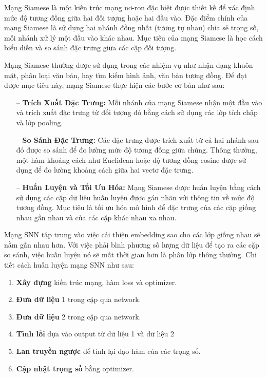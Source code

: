 \documentclass[a4paper, 12pt, openany]{book}
\begin{document}
Mạng Siamese là một kiến trúc mạng nơ-ron đặc biệt được thiết kế để xác định mức độ tương đồng giữa hai đối tượng hoặc hai đầu vào. Đặc điểm chính của mạng Siamese là sử dụng hai nhánh đồng nhất (tương tự nhau) chia sẻ trọng số, mỗi nhánh xử lý một đầu vào khác nhau. Mục tiêu của mạng Siamese là học cách biểu diễn và so sánh đặc trưng giữa các cặp đối tượng.

Mạng Siamese thường được sử dụng trong các nhiệm vụ như nhận dạng khuôn mặt, phân loại văn bản, hay tìm kiếm hình ảnh, văn bản tương đồng. Để đạt được mục tiêu này, mạng Siamese thực hiện các bước cơ bản như sau:

\begin{itemize}
    \item[--] \textbf{Trích Xuất Đặc Trưng:} Mỗi nhánh của mạng Siamese nhận một đầu vào và trích xuất đặc trưng từ đối tượng đó bằng cách sử dụng các lớp tích chập và lớp pooling.

    \item[--] \textbf{So Sánh Đặc Trưng:} Các đặc trưng được trích xuất từ cả hai nhánh sau đó được so sánh để đo lường mức độ tương đồng giữa chúng. Thông thường, một hàm khoảng cách như Euclidean hoặc độ tương đồng cosine được sử dụng để đo lường khoảng cách giữa hai vectơ đặc trưng.

    \item[--] \textbf{Huấn Luyện và Tối Ưu Hóa:} Mạng Siamese được huấn luyện bằng cách sử dụng các cặp dữ liệu huấn luyện được gán nhãn với thông tin về mức độ tương đồng. Mục tiêu là tối ưu hóa mô hình để đặc trưng của các cặp giống nhau gần nhau và của các cặp khác nhau xa nhau.
\end{itemize}

Mạng SNN tập trung vào việc cải thiện embedding sao cho các lớp giống nhau sẽ nằm gần nhau hơn. Với việc phải bình phương số lượng dữ liệu để tạo ra các cặp so sánh, việc huấn luyện nó sẽ mất thời gian hơn là phân lớp thông thường.
Chi tiết cách huấn luyện mạng SNN như sau:

\begin{enumerate}
    \item \textbf{Xây dựng} kiến trúc mạng, hàm loss và optimizer.
    \item \textbf{Đưa dữ liệu} 1 trong cặp qua network.
    \item \textbf{Đưa dữ liệu} 2 trong cặp qua network.
    \item \textbf{Tình lỗi} dựa vào output từ dữ liệu 1 và dữ liệu 2
    \item \textbf{Lan truyền ngược} để tính lại đạo hàm của các trọng số.
    \item \textbf{Cập nhật trọng số} bằng optimizer.
\end{enumerate}
\end{document}
